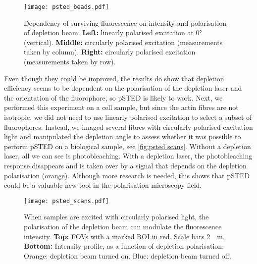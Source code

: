 \begin{figure}
	\centering
	\texttt{[image: psted\_beads.pdf]}
	\caption{
		Dependency of surviving fluorescence on intensity and polarisation of depletion beam. \textbf{Left:} linearly polarised excitation at 0° (vertical). \textbf{Middle:} circularly polarised excitation (measurements taken by column). \textbf{Right:} circularly polarised excitation (measurements taken by row). 
	}
	\label{fig:psted beads}
\end{figure}

Even though they could be improved, the results do show that depletion efficiency seems to be dependent on the polarisation of the depletion laser and the orientation of the fluorophore, so pSTED is likely to work. Next, we performed this experiment on a cell sample, but since the actin fibres are not isotropic, we did not need to use linearly polarised excitation to select a subset of fluorophores. Instead, we imaged several fibres with circularly polarised excitation light and manipulated the depletion angle to assess whether it was possible to perform pSTED on a biological sample, see \autoref{fig:psted scans}. Without a depletion laser, all we can see is photobleaching. With a depletion laser, the photobleaching response disappears and is taken over by a signal that depends on the depletion polarisation (orange). Although more research is needed, this shows that pSTED could be a valuable new tool in the polarisation microscopy field.

\begin{figure}
	\centering
	\texttt{[image: psted\_scans.pdf]}
	\caption{
		When samples are excited with circularly polarised light, the polarisation of the depletion beam can modulate the fluorescence intensity. \textbf{Top:} FOVs with a marked ROI in red. Scale bars \SI{2}{\mu m}. \textbf{Bottom:} Intensity profile, as a function of depletion polarisation. Orange: depletion beam turned on. Blue: depletion beam turned off. 
	}
	\label{fig:psted scans}
\end{figure}




























